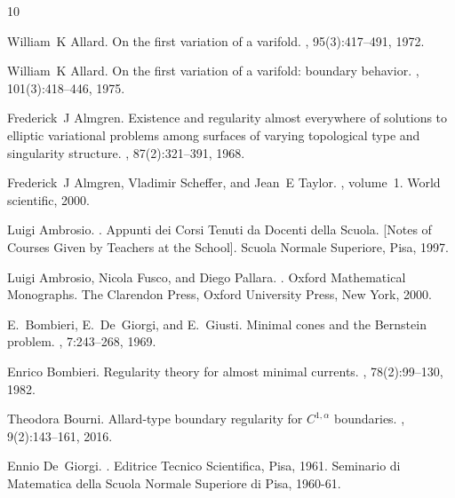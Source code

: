 \documentclass[a4paper,reqno,11pt]{amsart}
\begin{document}
%
\begin{thebibliography}{10}

William~K Allard.
\newblock On the first variation of a varifold.
, 95(3):417--491, 1972.

William~K Allard.
\newblock On the first variation of a varifold: boundary behavior.
, 101(3):418--446, 1975.

Frederick~J Almgren.
\newblock Existence and regularity almost everywhere of solutions to elliptic
  variational problems among surfaces of varying topological type and
  singularity structure.
, 87(2):321--391, 1968.

Frederick~J Almgren, Vladimir Scheffer, and Jean~E Taylor.
, volume~1.
\newblock World scientific, 2000.

Luigi Ambrosio.
.
\newblock Appunti dei Corsi Tenuti da Docenti della Scuola. [Notes of Courses
  Given by Teachers at the School]. Scuola Normale Superiore, Pisa, 1997.

Luigi Ambrosio, Nicola Fusco, and Diego Pallara.
.
\newblock Oxford Mathematical Monographs. The Clarendon Press, Oxford
  University Press, New York, 2000.

E.~Bombieri, E.~De~Giorgi, and E.~Giusti.
\newblock Minimal cones and the {B}ernstein problem.
, 7:243--268, 1969.

Enrico Bombieri.
\newblock Regularity theory for almost minimal currents.
, 78(2):99--130, 1982.

Theodora Bourni.
\newblock Allard-type boundary regularity for {$C^{1,\alpha}$} boundaries.
, 9(2):143--161, 2016.

Ennio De~Giorgi.
.
\newblock Editrice Tecnico Scientifica, Pisa, 1961.
\newblock Seminario di Matematica della Scuola Normale Superiore di Pisa,
  1960-61.


\end{thebibliography}
\end{document}
